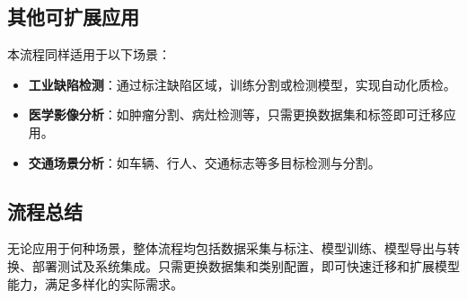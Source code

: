 \subsection{其他可扩展应用}

本流程同样适用于以下场景：
\begin{itemize}
    \item \textbf{工业缺陷检测}：通过标注缺陷区域，训练分割或检测模型，实现自动化质检。
    \item \textbf{医学影像分析}：如肿瘤分割、病灶检测等，只需更换数据集和标签即可迁移应用。
    \item \textbf{交通场景分析}：如车辆、行人、交通标志等多目标检测与分割。
\end{itemize}

\subsection{流程总结}

无论应用于何种场景，整体流程均包括数据采集与标注、模型训练、模型导出与转换、部署测试及系统集成。只需更换数据集和类别配置，即可快速迁移和扩展模型能力，满足多样化的实际需求。